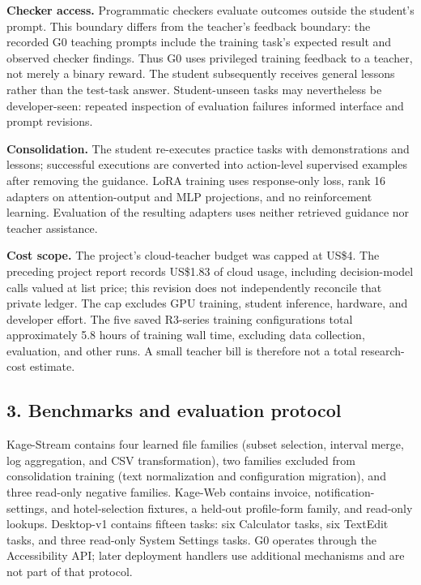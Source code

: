 \documentclass[
  10pt,
]{article}
\begin{document}
\textbf{Checker access.} Programmatic checkers evaluate outcomes outside
the student's prompt. This boundary differs from the teacher's feedback
boundary: the recorded G0 teaching prompts include the training task's
expected result and observed checker findings. Thus G0 uses privileged
training feedback to a teacher, not merely a binary reward. The student
subsequently receives general lessons rather than the test-task answer.
Student-unseen tasks may nevertheless be developer-seen: repeated
inspection of evaluation failures informed interface and prompt
revisions.

\textbf{Consolidation.} The student re-executes practice tasks with
demonstrations and lessons; successful executions are converted into
action-level supervised examples after removing the guidance. LoRA
training uses response-only loss, rank 16 adapters on attention-output
and MLP projections, and no reinforcement learning. Evaluation of the
resulting adapters uses neither retrieved guidance nor teacher
assistance.

\textbf{Cost scope.} The project's cloud-teacher budget was capped at
US\$4. The preceding project report records US\$1.83 of cloud usage,
including decision-model calls valued at list price; this revision does
not independently reconcile that private ledger. The cap excludes GPU
training, student inference, hardware, and developer effort. The five
saved R3-series training configurations total approximately 5.8 hours of
training wall time, excluding data collection, evaluation, and other
runs. A small teacher bill is therefore not a total research-cost
estimate.

\subsection{3. Benchmarks and evaluation
protocol}\label{benchmarks-and-evaluation-protocol}

Kage-Stream contains four learned file families (subset selection,
interval merge, log aggregation, and CSV transformation), two families
excluded from consolidation training (text normalization and
configuration migration), and three read-only negative families.
Kage-Web contains invoice, notification-settings, and hotel-selection
fixtures, a held-out profile-form family, and read-only lookups.
Desktop-v1 contains fifteen tasks: six Calculator tasks, six TextEdit
tasks, and three read-only System Settings tasks. G0 operates through
the Accessibility API; later deployment handlers use additional
mechanisms and are not part of that protocol.
\end{document}
